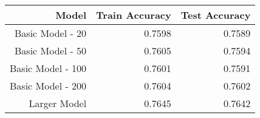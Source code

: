 \begin{tabular}{|r||r|r|}
\hline
Model & Train Accuracy & Test Accuracy \\
\hline
Basic Model - 20 & 0.7598 & 0.7589 \\
Basic Model - 50 & 0.7605 & 0.7594 \\
Basic Model - 100 & 0.7601 & 0.7591 \\
Basic Model - 200 & 0.7604 & 0.7602 \\
Larger Model & 0.7645 & 0.7642 \\
\hline
\end{tabular}
